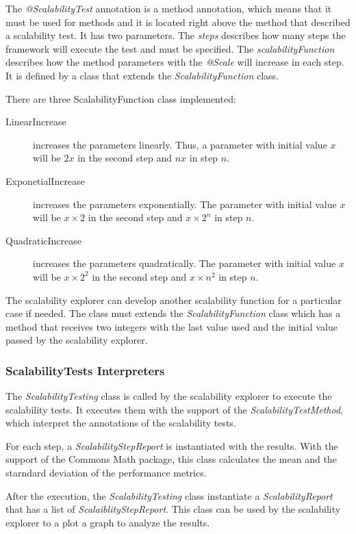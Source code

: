 The \emph{@ScalabilityTest} annotation is a method annotation, which means that it must be used for methods and it is located right above the method that described a scalability test. It has two parameters. The \emph{steps} describes how many steps the framework will execute the test and must be specified. The \emph{scalabilityFunction} describes how the method parameters with the \emph{@Scale} will increase in each step. It is defined by a class that extends the \emph{ScalabilityFunction} class.

There are three ScalabilityFunction class implemented:
\begin{description}
\item[LinearIncrease] increases the parameters linearly. Thus, a parameter with initial value $x$ will be $2x$ in the second step and $nx$ in step $n$.
\item[ExponetialIncrease] increases the parameters exponentially. The parameter with initial value $x$ will be $x \times 2$ in the second step and $x \times 2^n$ in step $n$.
\item[QuadraticIncrease] increases the parameters quadratically. The parameter with initial value $x$ will be $x \times 2^2$ in the second step and $x \times n^2$ in step $n$.
\end{description}

The scalability explorer can develop another scalability function for a particular case if needed. The class must extends the \emph{ScalabilityFunction} class which has a method that receives two integers with the last value used and the initial value passed by the scalability explorer.

\subsubsection{ScalabilityTests Interpreters}
The \emph{ScalabilityTesting} class is called by the scalability explorer to execute the scalability tests. It executes them with the support of the \emph{ScalabilityTestMethod}, which interpret the annotations of the scalability tests.

For each step, a \emph{ScalabilityStepReport} is instantiated with the results. With the support of the Commons Math package, this class calculates the mean and the starndard deviation of the performance metrics.

After the execution, the \emph{ScalabilityTesting} class instantiate a \emph{ScalabilityReport} that has a list of \emph{ScalaiblityStepReport}. This class can be used by the scalability explorer to a plot a graph to analyze the results.

